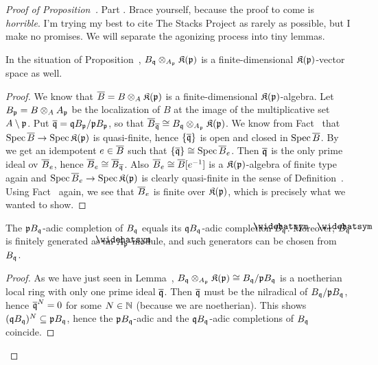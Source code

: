 \documentclass[a4paper,parskip=half,numbers=enddot, DIV=12]{scrreprt}
\begin{document}
\begin{proof}[Proof of Proposition~]
	Part . Brace yourself, because the proof to come is \emph{horrible}. I'm trying my best to cite The Stacks Project as rarely as possible, but I make no promises. We will separate the agonizing process into tiny lemmas.
	\begin{lem}
		In the situation of Proposition~, $B_{\mathfrak{q}}\otimes_{A_{\mathfrak{p}}}\mathfrak{K}(\mathfrak{p})$ is a finite-dimensional $\mathfrak{K}(\mathfrak{p})$-vector space as well.
	\end{lem}
	\begin{proof}
		We know that $\overline{B}=B\otimes_A\mathfrak{K}(\mathfrak{p})$ is a finite-dimensional $\mathfrak{K}(\mathfrak{p})$-algebra. Let $B_{\mathfrak{p}}=B\otimes_AA_{\mathfrak{p}}$ be the localization of $B$ at the image of the multiplicative set $A\setminus \mathfrak{p}$. Put $\overline{\mathfrak{q}}=\mathfrak{q} B_{\mathfrak{p}}/\mathfrak{p} B_{\mathfrak{p}}$, so that $\overline{B}_{\overline{\mathfrak{q}}}\cong B_{\mathfrak{q}}\otimes_{A_{\mathfrak{p}}}\mathfrak{K}(\mathfrak{p})$. We know from Fact~ that $\Spec\ov{B}\morphism\Spec \KK(\pp)$ is quasi-finite, hence $\left\{\overline{\mathfrak{q}}\right\}$ is open and closed in $\operatorname{Spec}\overline{B}$. By \cite[]{stacks-project} we get an idempotent $e\in \overline{B}$ such that $\left\{\overline{\mathfrak{q}}\right\}\cong \operatorname{Spec} \overline{B}_e$. Then $\overline{\mathfrak{q}}$ is the only prime ideal ov $\overline{B}_e$, hence $\overline{B}_e\cong \overline{B}_{\overline{\mathfrak{q}}}$. Also $\overline{B}_e\cong \overline{B}[e^{-1}]$ is a $\mathfrak{K}(\mathfrak{p})$-algebra of finite type again and $\Spec \ov{B}_e\morphism \Spec \KK(\pp)$ is clearly quasi-finite in the sense of Definition~. Using Fact~ again, we see that $\overline{B}_e$ is finite over $\mathfrak{K}(\mathfrak{p})$, which is precisely what we wanted to show.
	\end{proof}
	\begin{lem}
		The $\mathfrak{p} B_{\mathfrak{q}}$-adic completion of $B_{\mathfrak{q}}$ equals its $\mathfrak{q} B_{\mathfrak{q}}$-adic completion $\roof{B}_\qq$. Moreover, $\roof{B}_\qq$ is finitely generated as an $\roof{A}_\pp$-module, and such generators can be chosen from $B_{\mathfrak{q}}$.
	\end{lem}
	\begin{proof}
		As we have just seen in Lemma~, $B_{\mathfrak{q}}\otimes_{A_{\mathfrak{p}}}\mathfrak{K}(\mathfrak{p})\cong B_{\mathfrak{q}}/\mathfrak{p} B_{\mathfrak{q}}$ is a noetherian local ring with only one prime ideal $\overline{\mathfrak{q}}$. Then $\overline{\mathfrak{q}}$ must be the nilradical of $B_{\mathfrak{q}}/\mathfrak{p} B_{\mathfrak{q}}$, hence $\overline{\mathfrak{q}}^N=0$ for some $N\in\mathbb{N}$ (because we are noetherian). This shows $(\mathfrak{q} B_{\mathfrak{q}})^N\subseteq \mathfrak{p} B_{\mathfrak{q}}$, hence the $\mathfrak{p} B_{\mathfrak{q}}$-adic and the $\mathfrak{q} B_{\mathfrak{q}}$-adic completions of $B_{\mathfrak{q}}$ coincide.
		

\end{proof}
\end{proof}
\end{document}
